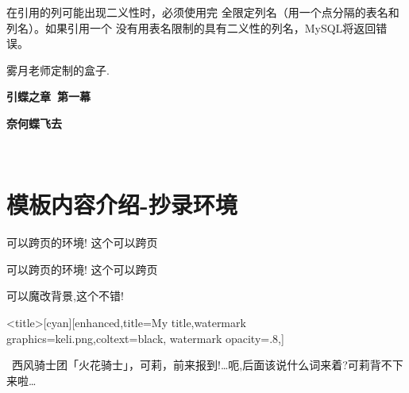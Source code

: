 \begin{tcblisting}{}
\begin{warning}[title={{\color{mred} \faDropbox} 完全限定列名：\ }]
在引用的列可能出现二义性时，必须使用完
全限定列名（用一个点分隔的表名和列名）。如果引用一个
没有用表名限制的具有二义性的列名，MySQL将返回错误。
\end{warning}
\end{tcblisting}

雾月老师定制的盒子.
\begin{ysbox}
\zhlipsum[2]
\end{ysbox}
%
\begin{ysbox}
\centering
\medskip
{\bfseries 引蝶之章\ 第一幕}
\par\bigskip

{\bfseries 奈何蝶飞去}

\par\medskip

\begin{center}
     \\
\end{center}
\centering
{}

\end{ysbox}


\section{模板内容介绍-抄录环境}
可以跨页的环境!
这个可以跨页
\btrule{}
\begin{tcblisting}{}
可以跨页的环境!
这个可以跨页
\btrule{}
\end{tcblisting}
%
%
可以魔改背景,这个不错!
\begin{ascolorbox5}[subtitle]{<title>}[cyan][enhanced,title=My title,watermark graphics=keli.png,coltext=black,
    watermark opacity=.8,]
    \lipsum[2]
    \tcblower
    \begin{center}
    \end{center}
    \begin{center}{\textcolor[RGB]{255, 0,
                0}{\faHeart}~西风骑士团「火花骑士」，可莉，前来报到!…呃,后面该说什么词来着?可莉背不下来啦…~
            \textcolor[RGB]{255, 0, 0}{\faHeart}}
    \end{center}
\end{ascolorbox5}


